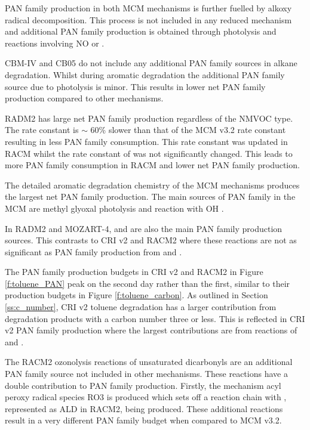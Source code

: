 PAN family production in both MCM mechanisms is further fuelled by alkoxy radical decomposition. 
This process is not included in any reduced mechanism and additional PAN family production is obtained through photolysis and reactions involving NO or . 

CBM-IV and CB05 do not include any additional PAN family sources in alkane degradation. 
Whilst during aromatic degradation the additional PAN family source due to photolysis is minor. 
This results in lower net PAN family production compared to other mechanisms.

RADM2 has large net PAN family production regardless of the NMVOC type. 
The  rate constant is $\sim$ 60\% slower than that of the MCM v3.2 rate constant resulting in less PAN family consumption. 
This rate constant was updated in RACM whilst the rate constant of  was not significantly changed. 
This leads to more PAN family consumption in RACM and lower net PAN family production.

The detailed aromatic degradation chemistry of the MCM mechanisms produces the largest net PAN family production. 
The main sources of PAN family in the MCM are methyl glyoxal photolysis  and reaction with OH .
\begin{reactionlist}
\end{reactionlist}
In RADM2 and MOZART-4,  and  are also the main PAN family production sources. 
This contrasts to CRI v2 and RACM2 where these reactions are not as significant as PAN family production from  and .
\begin{reactionlist}
\end{reactionlist}

The PAN family production budgets in CRI v2 and RACM2 in Figure \ref{f:toluene_PAN} peak on the second day rather than the first, similar to their  production budgets in Figure \ref{f:toluene_carbon}. 
As outlined in Section \ref{ss:c_number}, CRI v2 toluene degradation has a larger contribution from degradation products with a carbon number three or less. 
This is reflected in CRI v2 PAN family production where the largest contributions are from reactions of  and .

The RACM2 ozonolysis reactions of unsaturated dicarbonyls are an additional PAN family source not included in other mechanisms. 
These reactions have a double contribution to PAN family production. 
Firstly, the mechanism acyl peroxy radical species RO3 is produced which sets off a reaction chain with , represented as ALD in RACM2, being produced. 
These additional reactions result in a very different PAN family budget when compared to MCM v3.2.
